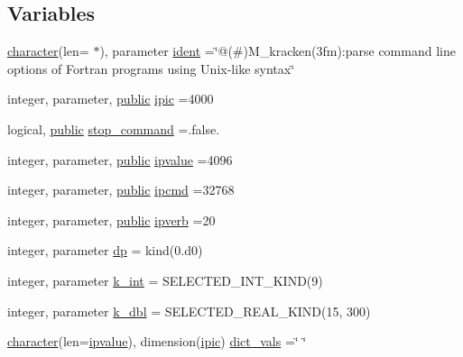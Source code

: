 \subsection*{Variables}
\begin{DoxyCompactItemize}
\item 
\hyperlink{option__stopwatch_83_8txt_abd4b21fbbd175834027b5224bfe97e66}{character}(len= $\ast$), parameter \hyperlink{namespacem__kracken_a280e9cc13c1be9621bd79a970851f3fa}{ident} =\char`\"{}@(\#)M\+\_\+kracken(3fm)\+:parse command line options of Fortran programs using Unix-\/like syntax\char`\"{}
\item 
integer, parameter, \hyperlink{M__stopwatch_83_8txt_a2f74811300c361e53b430611a7d1769f}{public} \hyperlink{namespacem__kracken_a447be9e6b10e207b63049215d9274774}{ipic} =4000
\item 
logical, \hyperlink{M__stopwatch_83_8txt_a2f74811300c361e53b430611a7d1769f}{public} \hyperlink{namespacem__kracken_a89f0eab0a97826df5108b9318a7bb345}{stop\+\_\+command} =.false.
\item 
integer, parameter, \hyperlink{M__stopwatch_83_8txt_a2f74811300c361e53b430611a7d1769f}{public} \hyperlink{namespacem__kracken_a9e71724677cede703e1fb186e446349f}{ipvalue} =4096
\item 
integer, parameter, \hyperlink{M__stopwatch_83_8txt_a2f74811300c361e53b430611a7d1769f}{public} \hyperlink{namespacem__kracken_aa2cfa3076819f58387ffb774620027c2}{ipcmd} =32768
\item 
integer, parameter, \hyperlink{M__stopwatch_83_8txt_a2f74811300c361e53b430611a7d1769f}{public} \hyperlink{namespacem__kracken_adda44fb0845c3cec44bc5a5bb258b395}{ipverb} =20
\item 
integer, parameter \hyperlink{namespacem__kracken_a1de91e5ca55bf4fab118936bf4fad36a}{dp} = kind(0.d0)
\item 
integer, parameter \hyperlink{namespacem__kracken_ae51c6f835203dd09fc3be239fc9d0ce1}{k\+\_\+int} = S\+E\+L\+E\+C\+T\+E\+D\+\_\+\+I\+N\+T\+\_\+\+K\+I\+ND(9)
\item 
integer, parameter \hyperlink{namespacem__kracken_a002abf985e8365e06a05ebde2f2b9b52}{k\+\_\+dbl} = S\+E\+L\+E\+C\+T\+E\+D\+\_\+\+R\+E\+A\+L\+\_\+\+K\+I\+ND(15, 300)
\item 
\hyperlink{option__stopwatch_83_8txt_abd4b21fbbd175834027b5224bfe97e66}{character}(len=\hyperlink{namespacem__kracken_a9e71724677cede703e1fb186e446349f}{ipvalue}), dimension(\hyperlink{namespacem__kracken_a447be9e6b10e207b63049215d9274774}{ipic}) \hyperlink{namespacem__kracken_a1b8cabc9e407b8d9496f6fdb5c8da911}{dict\+\_\+vals} =\char`\"{} \char`\"{}

\end{DoxyCompactItemize}
